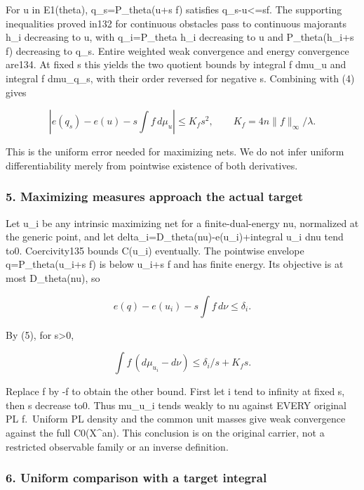 \documentclass[
]{article}
\begin{document}
For u in E1(theta), q\_s=P\_theta(u+s f) satisfies
\textbar\textbar q\_s-u\textbar\textbar\textless=\textbar s\textbar\textbar\textbar f\textbar\textbar.
The supporting inequalities proved in132 for continuous obstacles pass
to continuous majorants h\_i decreasing to u, with q\_i=P\_theta h\_i
decreasing to u and P\_theta(h\_i+s f) decreasing to q\_s. Entire
weighted weak convergence and energy convergence are134. At fixed s this
yields the two quotient bounds by integral f dmu\_u and integral f
dmu\_q\_s, with their order reversed for negative s. Combining with (4)
gives

\[\left|e(q_s)-e(u)-s\int f\,d\mu_u\right|
\leq K_f s^2,\qquad K_f=4n\|f\|_\infty/\lambda.\tag{5}\]

This is the uniform error needed for maximizing nets. We do not infer
uniform differentiability merely from pointwise existence of both
derivatives.

\subsubsection{5. Maximizing measures approach the actual
target}\label{maximizing-measures-approach-the-actual-target}

Let u\_i be any intrinsic maximizing net for a finite-dual-energy nu,
normalized at the generic point, and let
delta\_i=D\_theta(nu)-e(u\_i)+integral u\_i dnu tend to0. Coercivity135
bounds C(u\_i) eventually. The pointwise envelope q=P\_theta(u\_i+s f)
is below u\_i+s f and has finite energy. Its objective is at most
D\_theta(nu), so

\[e(q)-e(u_i)-s\int f\,d\nu\leq\delta_i.\]

By (5), for s\textgreater0,

\[\int f\,(d\mu_{u_i}-d\nu)\leq\delta_i/s+K_f s.\]

Replace f by -f to obtain the other bound. First let i tend to infinity
at fixed s, then s decrease to0. Thus mu\_u\_i tends weakly to nu
against EVERY original PL f.~Uniform PL density and the common unit
masses give weak convergence against the full C0(X\^{}an). This
conclusion is on the original carrier, not a restricted observable
family or an inverse definition.

\subsubsection{6. Uniform comparison with a target
integral}\label{uniform-comparison-with-a-target-integral}
\end{document}
